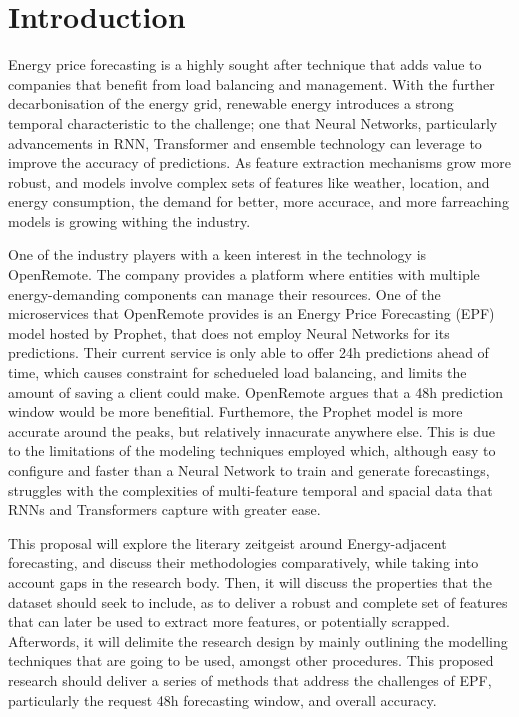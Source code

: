 \section{Introduction}
Energy price forecasting is a highly sought after technique that adds value to companies that benefit from load balancing and management. With the further decarbonisation of the energy grid, renewable energy introduces
a strong temporal characteristic to the challenge; one that Neural Networks, particularly advancements in RNN\cite{Aksu2026,Xu2025,Shao2021,Fang2023,Manero2018}, Transformer\cite{Kong2025,Wang2026,Oliveira2023,9756020} and ensemble\cite{math11030676,CHEN2025126302,Hussan2026-dy} technology can leverage to improve the accuracy of predictions. As feature extraction mechanisms grow more robust\cite{CHEN2025126302,Aksu2026,Xu2025,4494757,Shao2021},
and models involve complex sets of features like weather\cite{9788043, Wang2026}, location, and energy consumption\cite{4494757}, the demand for better, more accurace, and more farreaching models is growing withing the industry.

One of the industry players with a keen interest in the technology is OpenRemote. The company provides a platform where entities with multiple energy-demanding components can manage their resources. One of the microservices
that OpenRemote provides is an Energy Price Forecasting (EPF) model hosted by Prophet, that does not employ Neural Networks for its predictions\cite{Taylor2017}. Their current service is only able to offer 24h
predictions ahead of time, which causes constraint for schedueled load balancing, and limits the amount of saving a client could make. OpenRemote argues that a 48h prediction window would be more benefitial. Furthemore, the Prophet model is more accurate around the peaks, but 
relatively innacurate anywhere else. This is due to the limitations of the modeling techniques employed which, although easy to configure and faster than a Neural Network to train and generate forecastings, struggles 
with the complexities of multi-feature temporal and spacial data that RNNs and Transformers capture with greater ease.

This proposal will explore the literary zeitgeist around Energy-adjacent forecasting, and discuss their methodologies comparatively, while taking into account gaps in the research body. Then, it will discuss the
properties that the dataset should seek to include, as to deliver a robust and complete set of features that can later be used to extract more features, or potentially scrapped. Afterwords, it will 
delimite the research design by mainly outlining the modelling techniques that are going to be used, amongst other procedures.
This proposed research should deliver a series of methods that address the challenges of EPF, particularly the request 48h forecasting window, and overall accuracy.